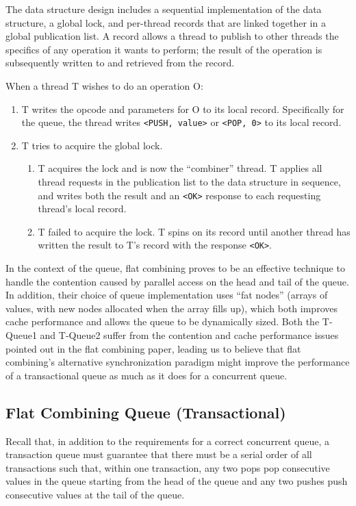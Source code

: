 The data structure design includes a sequential implementation of the data structure, a global lock, and per-thread records that are linked together in a global publication list. A record allows a thread to publish to other threads the specifics of any operation it wants to perform; the result of the operation is subsequently written to and retrieved from the record.

When a thread T wishes to do an operation O:
\begin{enumerate}
    \item T writes the opcode and parameters for O to its local record. Specifically for the queue, the thread writes \texttt{<PUSH, value>} or \texttt{<POP, 0>} to its local record.
   \item T tries to acquire the global lock.
   \begin{enumerate}
        \item T acquires the lock and is now the “combiner” thread. T applies all thread requests in the publication list to the data structure in sequence, and writes both the result and an \texttt{<OK>} response to each requesting thread's local record.
        \item T failed to acquire the lock. T spins on its record until another thread has written the result to T's record with the response \texttt{<OK>}.
    \end{enumerate}
\end{enumerate}

In the context of the queue, flat combining proves to be an effective technique to handle the contention caused by parallel access on the head and tail of the queue. In addition, their choice of queue implementation uses ``fat nodes'' (arrays of values, with new nodes allocated when the array fills up), which both improves cache performance and allows the queue to be dynamically sized. Both the T-Queue1 and T-Queue2 suffer from the contention and cache performance issues pointed out in the flat combining paper, leading us to believe that flat combining's alternative synchronization paradigm might improve the performance of a transactional queue as much as it does for a concurrent queue.

\subsection{Flat Combining Queue (Transactional)}
\label{fcqueuet}

Recall that, in addition to the requirements for a correct concurrent queue, a transaction queue must guarantee that there must be a serial order of all transactions such that, within one transaction, any two pops pop consecutive values in the queue starting from the head of the queue and any two pushes push consecutive values at the tail of the queue.

